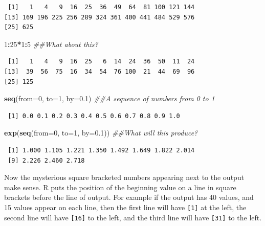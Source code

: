 \documentclass[
]{krantz}
\makeatletter
\newenvironment{Shaded}{\begin{snugshade}}{\end{snugshade}}
\newcommand{\CommentTok}[1]{\textcolor[rgb]{0.37,0.37,0.37}{\textit{#1}}}
\newcommand{\DataTypeTok}[1]{\textcolor[rgb]{0.27,0.27,0.27}{#1}}
\newcommand{\DecValTok}[1]{\textcolor[rgb]{0.06,0.06,0.06}{#1}}
\newcommand{\FloatTok}[1]{\textcolor[rgb]{0.06,0.06,0.06}{#1}}
\newcommand{\KeywordTok}[1]{\textcolor[rgb]{0.27,0.27,0.27}{\textbf{#1}}}
\newcommand{\NormalTok}[1]{#1}
\newcommand{\OperatorTok}[1]{\textcolor[rgb]{0.43,0.43,0.43}{\textbf{#1}}}
\newenvironment{kframe}{%
\medskip{}
\setlength{\fboxsep}{.8em}
 \def\at@end@of@kframe{}%
 \ifinner\ifhmode%
  \def\at@end@of@kframe{\end{minipage}}%
  \begin{minipage}{\columnwidth}%
 \fi\fi%
 \def\FrameCommand##1{\hskip\@totalleftmargin \hskip-\fboxsep
 \colorbox{shadecolor}{##1}\hskip-\fboxsep
     \hskip-\linewidth \hskip-\@totalleftmargin \hskip\columnwidth}%
 \MakeFramed {\advance\hsize-\width
   \@totalleftmargin\z@ \linewidth\hsize
   \@setminipage}}%
 {\par\unskip\endMakeFramed%
 \at@end@of@kframe}
\renewenvironment{Shaded}{\begin{kframe}}{\end{kframe}}
\makeatother
\begin{document}
\begin{verbatim}
 [1]   1   4   9  16  25  36  49  64  81 100 121 144
[13] 169 196 225 256 289 324 361 400 441 484 529 576
[25] 625
\end{verbatim}

\begin{Shaded}
\begin{Highlighting}[]
\DecValTok{1}\OperatorTok{:}\DecValTok{25}\OperatorTok{*}\DecValTok{1}\OperatorTok{:}\DecValTok{5} \CommentTok{\#\#What about this?}
\end{Highlighting}
\end{Shaded}

\begin{verbatim}
 [1]   1   4   9  16  25   6  14  24  36  50  11  24
[13]  39  56  75  16  34  54  76 100  21  44  69  96
[25] 125
\end{verbatim}

\begin{Shaded}
\begin{Highlighting}[]
\KeywordTok{seq}\NormalTok{(}\DataTypeTok{from=}\DecValTok{0}\NormalTok{, }\DataTypeTok{to=}\DecValTok{1}\NormalTok{, }\DataTypeTok{by=}\FloatTok{0.1}\NormalTok{) }\CommentTok{\#\#A sequence of numbers from 0 to 1}
\end{Highlighting}
\end{Shaded}

\begin{verbatim}
 [1] 0.0 0.1 0.2 0.3 0.4 0.5 0.6 0.7 0.8 0.9 1.0
\end{verbatim}

\begin{Shaded}
\begin{Highlighting}[]
\KeywordTok{exp}\NormalTok{(}\KeywordTok{seq}\NormalTok{(}\DataTypeTok{from=}\DecValTok{0}\NormalTok{, }\DataTypeTok{to=}\DecValTok{1}\NormalTok{, }\DataTypeTok{by=}\FloatTok{0.1}\NormalTok{)) }\CommentTok{\#\#What will this produce?}
\end{Highlighting}
\end{Shaded}

\begin{verbatim}
 [1] 1.000 1.105 1.221 1.350 1.492 1.649 1.822 2.014
 [9] 2.226 2.460 2.718
\end{verbatim}

Now the mysterious square bracketed numbers appearing next to the output make sense. R puts the position of the beginning value on a line in square brackets before the line of output. For example if the output has 40 values, and 15 values appear on each line, then the first line will have \texttt{{[}1{]}} at the left, the second line will have \texttt{{[}16{]}} to the left, and the third line will have \texttt{{[}31{]}} to the left.
\end{document}
